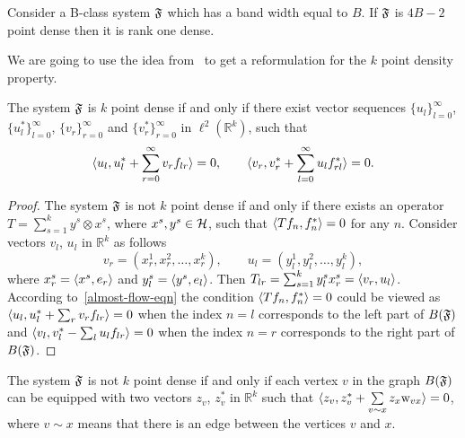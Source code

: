\documentclass[12pt,oneside,a4paper]{amsart}
\begin{document}
      \begin{theorem}
        \label{thm-kpd}
        Consider a B-class system $\fsys$ which has a band width equal to $B$.
        If $\fsys$ is $4B - 2$ point dense then it is rank one dense.
      \end{theorem}
      We are going to use the idea from~\cite{me} to get a reformulation for the $k$ point density property.
      \begin{prop}
        \label{prop-vec-est}
        The system $\fsys$ is $k$ point dense if and only if there exist vector sequences $\{u_l\}_{l=0}^\infty$, $\{u^*_l\}_{l=0}^\infty$,
          $\{v_r\}_{r=0}^\infty$ and $\{v^*_r\}_{r=0}^\infty$ in $\ell^2 (\mathbb{R}^k)$, such that
        \begin{equation}
          \label{prop-vec-eqn}
          \inner{u_l}{u^*_l + \sum_{r=0}^\infty v_r f_{lr}} = 0, \quad \quad
          \inner{v_r}{v^*_r + \sum_{l=0}^\infty u_l f_{rl}^*} = 0.
        \end{equation}
      \end{prop}
      \begin{proof}
        The system $\fsys$ is not $k$ point dense if and only if there exists an operator $T = \sum_{s=1}^k y^s \otimes x^s$, where
          $x^s, y^s \in \cal{H}$, such that $\inner{Tf_n}{f_n^*} = 0$ for any $n$.
        Consider vectors $v_l$, $u_l$ in $\mathbb{R}^k$ as follows
        \begin{equation*}
          v_r = (x^1_r, x^2_r, \dots, x^k_r),\qquad
          u_l = (y^1_l, y^2_l, \dots, y^k_l),
        \end{equation*}
          where $x^s_r = \inner{x^s}{e_r}$ and $y^s_l = \inner{y^s}{e_l}$.
        Then $T_{lr} = \sum_{s=1}^k y^s_l x^s_r = \inner{v_r}{u_l}$.
        According to~\eqref{almost-flow-eqn} the condition $\inner{Tf_n}{f^*_n} = 0$ could be viewed as
          $\inner{u_l}{u^*_l + \sum_r v_r f_{lr}} = 0$
        when the index $n=l$ corresponds to the left part of $B(\fsys)$ and
          $\inner{v_l}{v^*_l - \sum_l u_l f_{lr}} = 0$
        when the index $n=r$ corresponds to the right part of $B(\fsys)$.
      \end{proof}
      \begin{corol*}
        The system $\fsys$ is not $k$ point dense if and only if each vertex $v$ in the graph $B(\fsys)$ can be
          equipped with two vectors $z_v$, $z_v^*$ in $\mathbb{R}^k$ such that $\inner{z_v}{z_v^* + \sum\limits_{v \sim x} z_x \wt_{vx}} = 0$,
          where $v \sim x$ means that there is an edge between the vertices $v$ and $x$.
      \end{corol*}
\end{document}
